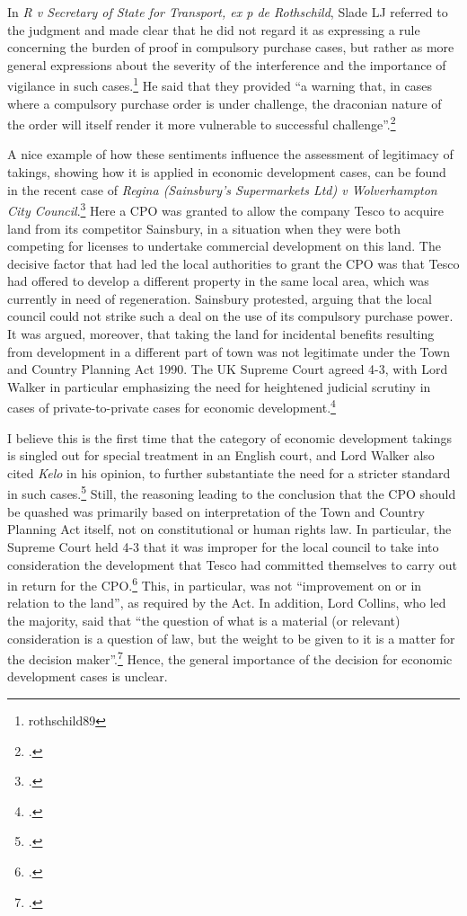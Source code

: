 In {\it R v Secretary of State for Transport, ex p de Rothschild}, Slade LJ referred to the judgment and made clear that he did not regard it as expressing a rule concerning the burden of proof in compulsory purchase cases, but rather as more general expressions about the severity of the interference and the importance of vigilance in such cases.\footnote{rothschild89} He said that they provided ``a warning that, in cases where a compulsory purchase order is under challenge, the draconian nature of the order will itself render it more vulnerable to successful challenge''.\footcite[938]{rothschild89}

A nice example of how these sentiments influence the assessment of legitimacy of takings, showing how it is applied in economic development cases, can be found in the recent case of {\it Regina (Sainsbury’s Supermarkets Ltd) v Wolverhampton City Council}.\footcite{sainsbury10} Here a CPO was granted to allow the company Tesco to acquire land from its competitor Sainsbury, in a situation when they were both competing for licenses to undertake commercial development on this land. The decisive factor that had led the local authorities to grant the CPO was that Tesco had offered to develop a different property in the same local area, which was currently in need of regeneration. Sainsbury protested, arguing that the local council could not strike such a deal on the use of its compulsory purchase power. It was argued, moreover, that taking the land for incidental benefits resulting from development in a different part of town was not legitimate under the Town and Country Planning Act 1990. The UK Supreme Court agreed 4-3, with Lord Walker in particular emphasizing the need for heightened judicial scrutiny in cases of private-to-private cases for economic development.\footcite[80-84]{sainsbury10}

I believe this is the first time that the category of economic development takings is singled out for special treatment in an English court, and Lord Walker also cited {\it Kelo} in his opinion, to further substantiate the need for a stricter standard in such cases.\footcite[81]{sainsbury10} Still, the reasoning leading to the conclusion that the CPO should be quashed was primarily based on interpretation of the Town and Country Planning Act itself, not on constitutional or human rights law. In particular, the Supreme Court held 4-3 that it was improper for the local council to take into consideration the development that Tesco had committed themselves to carry out in return for the CPO.\footcite[73-79]{sainsbury10} This, in particular, was not ``improvement on or in relation to the land'', as required by the Act. In addition, Lord Collins, who led the majority, said that ``the question of what is a material (or relevant) consideration is a question of law, but the weight to be given to it is a matter for the decision maker''.\footcite[70]{sainsbury10} Hence, the general importance of the decision for economic development cases is unclear.


